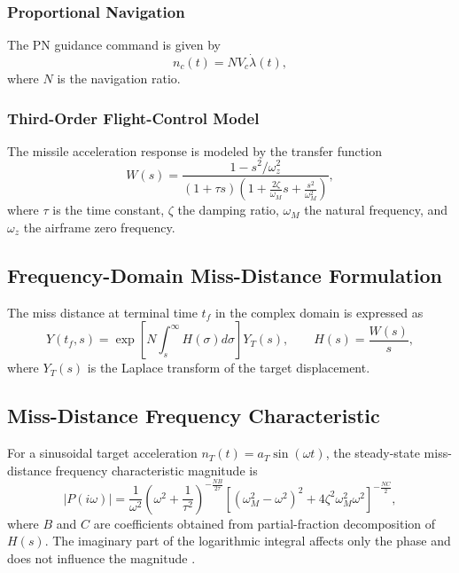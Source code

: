 \documentclass[11pt,a4paper]{article}
\begin{document}
\subsubsection{Proportional Navigation}
The PN guidance command is given by
\begin{equation}
n_c(t) = N V_c \dot\lambda(t),
\end{equation}
where $N$ is the navigation ratio.

\subsubsection{Third-Order Flight-Control Model}
The missile acceleration response is modeled by the transfer function
\begin{equation}
W(s)=\frac{1-s^2/\omega_z^2}{(1+\tau s)\left(1+\frac{2\zeta}{\omega_M}s+\frac{s^2}{\omega_M^2}\right)},
\end{equation}
where $\tau$ is the time constant, $\zeta$ the damping ratio, $\omega_M$ the natural frequency, and $\omega_z$ the airframe zero frequency.

\subsection{Frequency-Domain Miss-Distance Formulation}
The miss distance at terminal time $t_f$ in the complex domain is expressed as \cite{Yanushevsky2004,Yanushevsky2007}
\begin{equation}
Y(t_f,s)=\exp\left[N\int_s^{\infty}H(\sigma)d\sigma\right]Y_T(s), \qquad H(s)=\frac{W(s)}{s},
\end{equation}
where $Y_T(s)$ is the Laplace transform of the target displacement.

\subsection{Miss-Distance Frequency Characteristic}
For a sinusoidal target acceleration $n_T(t)=a_T\sin(\omega t)$, the steady-state miss-distance frequency characteristic magnitude is
\begin{equation}
|P(i\omega)|=\frac{1}{\omega^2}
\left(\omega^2+\frac{1}{\tau^2}\right)^{-\frac{NB}{2\tau}}
\left[(\omega_M^2-\omega^2)^2+4\zeta^2\omega_M^2\omega^2\right]^{-\frac{NC}{2}},
\end{equation}
where $B$ and $C$ are coefficients obtained from partial-fraction decomposition of $H(s)$. The imaginary part of the logarithmic integral affects only the phase and does not influence the magnitude \cite{Yanushevsky2004}.
\end{document}
